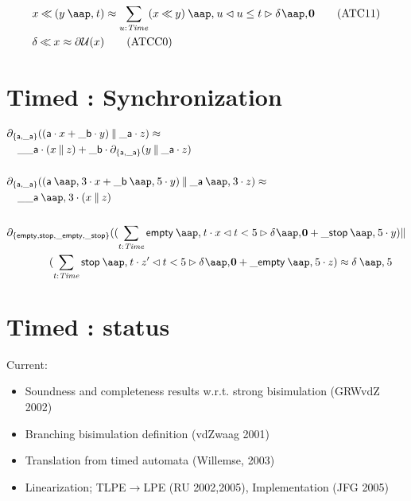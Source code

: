 \begin{slide}
\begin{footnotesize}
\begin{align}
&  x\tb(y\at t)\id \sum_{u\ap\Time}(x\tb y)\at u\lcond u\leq t\rcond\daz\tag{ATC11}\label{eq:ATC11}\\ %
&  \delta\tb x\id \udd(x)\tag{ATCC0}\label{eq:ATCC0} %
  \end{align}
\end{footnotesize}
\newslide\section*{Timed \mcrl: Synchronization}
\vspace{-1.5ex}
\begin{footnotesize}
  \begin{align*}
&  \encap{\set{\act{a},\act{\_a}}} ((\act{a}\seqc x+\act{\_b}\seqc y)\parc \act{\_a}\seqc z)\id\\
&  \quad\act{\_\_a}\seqc (x\parc z)+\act{\_b}\seqc\encap{\set{\act{a},\act{\_a}}} (y\parc\act{\_a}\seqc z)\\
&  \\
&  \encap{\set{\act{a},\act{\_a}}} ((\act{a}\at 3\seqc x+\act{\_b}\at 5\seqc y)\parc \act{\_a}\at 3\seqc z)\id\\
&  \quad\act{\_\_a}\at 3\seqc (x\parc z)\\
&  \\
&  \encap{\set{\act{empty},\act{stop},\act{\_empty},\act{\_stop}}} ((\sum_{t\ap\Time}\act{empty}\at t\seqc x\lcond t<5\rcond\daz+\act{\_stop}\at 5\seqc y)\parc\\
&\t4 (\sum_{t\ap\Time}\act{stop}\at t\seqc z'\lcond t<5\rcond\daz+\act{\_empty}\at 5\seqc z)\id\delta\at 5
  \end{align*}
\end{footnotesize}
\newslide\section*{Timed \mcrl: status}
Current:
\begin{itemize}
\item Soundness and completeness results w.r.t. strong bisimulation (GRWvdZ 2002)
\item Branching bisimulation definition (vdZwaag 2001)
\item Translation from timed automata (Willemse, 2003)
\item Linearization; TLPE$\to$LPE (RU 2002,2005), Implementation (JFG 2005)

\end{itemize}
\end{slide}
